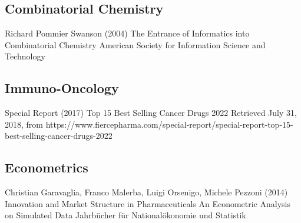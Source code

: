 \subsection{Combinatorial Chemistry}

Richard Pommier Swanson (2004)
\newblock The Entrance of Informatics into Combinatorial Chemistry
\newblock American Society for Information Science and Technology


\subsection{Immuno-Oncology}

Special Report (2017)
\newblock Top 15 Best Selling Cancer Drugs 2022
\newblock Retrieved July 31, 2018, from https://www.fiercepharma.com/special-report/special-report-top-15-best-selling-cancer-drugs-2022

\subsection{Econometrics}

 Christian Garavaglia, Franco Malerba, Luigi Orsenigo, Michele Pezzoni (2014)
\newblock Innovation and Market Structure in Pharmaceuticals An Econometric Analysis on Simulated Data
\newblock Jahrbücher für Nationalökonomie und Statistik 
